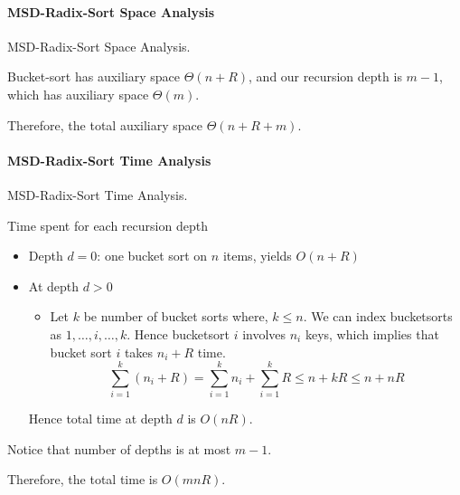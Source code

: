 \documentclass{article}
\begin{document}
\paragraph{MSD-Radix-Sort Space Analysis}

\noindent \begin{Question}{}
    MSD-Radix-Sort Space Analysis. 
\end{Question}

\begin{solution}
    Bucket-sort has auxiliary space $\Theta(n + R)$, and our recursion depth is $m - 1$, which has auxiliary space $\Theta(m)$. 
    \begin{tcolorbox}[colback=yellow!10!white,colframe=orange]
        Therefore, the total auxiliary space $\Theta(n + R + m)$. 
    \end{tcolorbox}
\end{solution}

\paragraph{MSD-Radix-Sort Time Analysis}

\noindent \begin{Question}{}
    MSD-Radix-Sort Time Analysis. 
\end{Question}

\begin{solution}
    Time spent for each recursion depth \begin{itemize}
        \item Depth $d = 0$: one bucket sort on $n$ items, yields $O(n + R)$
        \item At depth $d > 0$
        \begin{itemize}
            \item Let $k$ be number of bucket sorts where, $k \leq n$. We can index bucketsorts as $1, \ldots, i, \ldots, k$. Hence bucketsort $i$ involves $n_i$ keys, which implies that bucket sort $i$ takes $n_i + R$ time. 
            \[ \sum_{i=1}^k (n_i + R) = \sum_{i=1}^k n_i + \sum_{i=1}^k R \leq n + kR \leq n + nR \]
        \end{itemize}
        Hence total time at depth $d$ is $O(nR)$. 
    \end{itemize}
    Notice that number of depths is at most $m-1$. 
    \begin{tcolorbox}[colback=yellow!10!white,colframe=orange]
        Therefore, the total time is $O(mnR)$. 
    \end{tcolorbox}
\end{solution}
\end{document}
